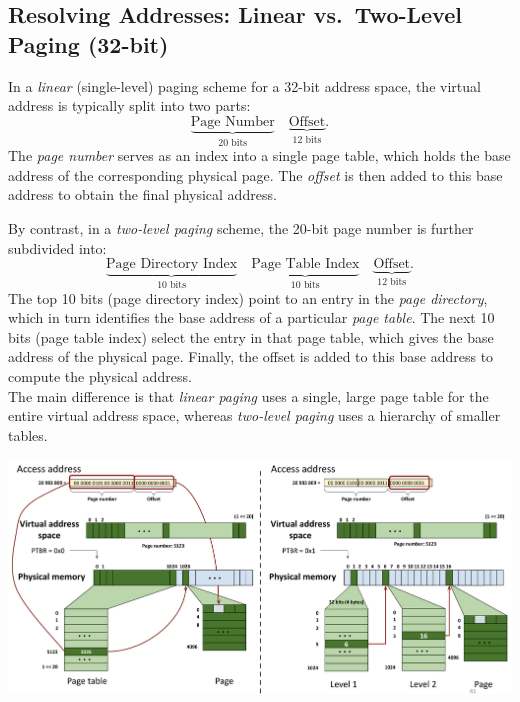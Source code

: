 \subsection{Resolving Addresses: Linear vs.\ Two-Level Paging (32-bit)}
\noindent
\begin{minipage}{0.42\textwidth}
\footnotesize
In a \emph{linear} (single-level) paging scheme for a 32-bit address space, the virtual address is typically split into two parts: 
\[
\underbrace{\text{Page Number}}_{20 \text{ bits}} \quad \underbrace{\text{Offset}}_{12 \text{ bits}}.
\]
The \emph{page number} serves as an index into a single page table, which holds the base address of the corresponding physical page. The \emph{offset} is then added to this base address to obtain the final physical address.

By contrast, in a \emph{two-level paging} scheme, the 20-bit page number is further subdivided into:
\[
\underbrace{\text{Page Directory Index}}_{10 \text{ bits}} 
\quad
\underbrace{\text{Page Table Index}}_{10 \text{ bits}}
\quad
\underbrace{\text{Offset}}_{12 \text{ bits}}.
\]
The top 10 bits (page directory index) point to an entry in the \emph{page directory}, which in turn identifies the base address of a particular \emph{page table}. The next 10 bits (page table index) select the entry in that page table, which gives the base address of the physical page. Finally, the offset is added to this base address to compute the physical address.\\[5px]
The main difference is that \emph{linear paging} uses a single, large page table for the entire virtual address space, whereas \emph{two-level paging} uses a hierarchy of smaller tables. 
\end{minipage}%
\hfill
\vline
\hfill
\begin{minipage}{0.55\textwidth}
  \begin{center}
    \includegraphics[width=1.2\textwidth]{chapters/L5/images/vs.png}
  \end{center}
\end{minipage}\\

